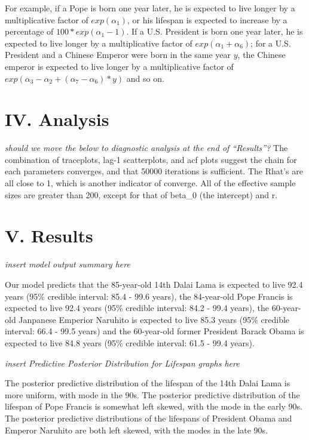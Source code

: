 \documentclass[]{article}
\begin{document}
For example, if a Pope is born one year later, he is expected to live
longer by a multiplicative factor of \(exp(\alpha_1)\), or his lifespan
is expected to increase by a percentage of \(100*exp(\alpha_1-1)\). If a
U.S. President is born one year later, he is expected to live longer by
a multiplicative factor of \(exp(\alpha_1 + \alpha_6)\); for a U.S.
President and a Chinese Emperor were born in the same year \(y\), the
Chinese emperor is expected to live longer by a multiplicative factor of
\(exp(\alpha_3 - \alpha_2 + (\alpha_7-\alpha_6)*y)\) and so on.

\hypertarget{iv.-analysis}{%
\section{IV. Analysis}\label{iv.-analysis}}

\emph{should we move the below to diagnostic analysis at the end of
``Results''?} The combination of traceplots, lag-1 scatterplots, and acf
plots suggest the chain for each parameters converges, and that 50000
iterations is sufficient. The Rhat's are all close to 1, which is
another indicator of converge. All of the effective sample sizes are
greater than 200, except for that of beta\_0 (the intercept) and r.

\hypertarget{v.-results}{%
\section{V. Results}\label{v.-results}}

\emph{insert model output summary here}

Our model predicts that the 85-year-old 14th Dalai Lama is expected to
live 92.4 years (95\% credible interval: 85.4 - 99.6 years), the
84-year-old Pope Francis is expected to live 92.4 years (95\% credible
interval: 84.2 - 99.4 years), the 60-year-old Janpanese Emperior
Naruhito is expected to live 85.3 years (95\% credible interval: 66.4 -
99.5 years) and the 60-year-old former President Barack Obama is
expected to live 84.8 years (95\% credible interval: 61.5 - 99.4 years).

\emph{insert Predictive Posterior Distribution for Lifespan graphs here}

The posterior predictive distribution of the lifespan of the 14th Dalai
Lama is more uniform, with mode in the 90s. The posterior predictive
distribution of the lifespan of Pope Francis is somewhat left skewed,
with the mode in the early 90s. The posterior predictive distributions
of the lifespans of President Obama and Emperor Naruhito are both left
skewed, with the modes in the late 90s.
\end{document}
